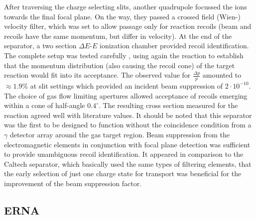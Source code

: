 After traversing the charge selecting slits, another quadrupole focussed the ions towards the final focal plane. On the way, they passed a crossed field (Wien-) velocity filter, which was set to allow passage only for reaction recoils (beam and recoils have the same momentum, but differ in velocity). At the end of the separator, a two section $\Delta{}E$-$E$ ionization chamber provided recoil identification. The complete setup was tested carefully \cite{gial96}, using again the  reaction to establish that the momentum distribution (also causing the recoil cone) of the  target reaction would fit into its acceptance. The observed value for $\frac{\Delta{}p}{p}$ amounted to $\approx1.9\%$ at slit settings which provided an incident  beam suppression of $2\cdot10^{-10}$. The choice of gas flow limiting apertures allowed acceptance of recoils emerging within a cone of half-angle $0.4^\circ$. The resulting cross section measured for the  reaction agreed well with literature values. It should be noted that this separator was the first to be designed to function without the coincidence condition from a $\gamma$ detector array around the gas target region. Beam suppression from the electromagnetic elements in conjunction with focal plane detection was sufficient to provide unambiguous  recoil identification. It appeared in comparison to the Caltech separator, which basically used the same types of filtering elements, that the early selection of just one charge state for transport was beneficial for the improvement of the beam suppression factor. 

\subsection{ERNA}

